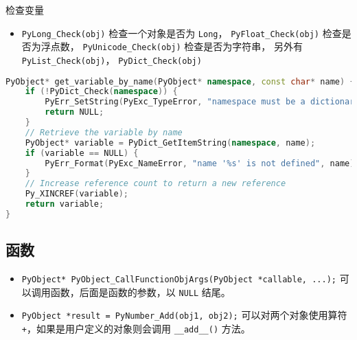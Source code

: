 检查变量
\begin{itemize}
\item \verb`PyLong_Check(obj)` 检查一个对象是否为 \verb`Long`， \verb`PyFloat_Check(obj)` 检查是否为浮点数， \verb`PyUnicode_Check(obj)` 检查是否为字符串， 另外有 \verb`PyList_Check(obj)`， \verb`PyDict_Check(obj)`
\end{itemize}

\begin{lstlisting}[language=cpp]
PyObject* get_variable_by_name(PyObject* namespace, const char* name) {
    if (!PyDict_Check(namespace)) {
        PyErr_SetString(PyExc_TypeError, "namespace must be a dictionary");
        return NULL;
    }
    // Retrieve the variable by name
    PyObject* variable = PyDict_GetItemString(namespace, name);
    if (variable == NULL) {
        PyErr_Format(PyExc_NameError, "name '%s' is not defined", name);
    }
    // Increase reference count to return a new reference
    Py_XINCREF(variable);
    return variable;
}
\end{lstlisting}

\subsection{函数}
\begin{itemize}
\item \verb`PyObject* PyObject_CallFunctionObjArgs(PyObject *callable, ...);` 可以调用函数，后面是函数的参数，以 \verb`NULL` 结尾。
\item \verb`PyObject *result = PyNumber_Add(obj1, obj2);` 可以对两个对象使用算符 \verb`+`，如果是用户定义的对象则会调用 \verb`__add__()` 方法。
\end{itemize}
